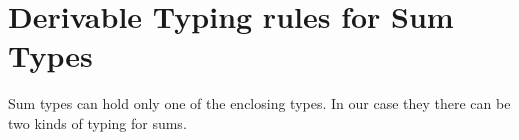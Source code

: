 \section{Derivable Typing rules for Sum Types}\label{sec:sums}
Sum types can hold only one of the enclosing types.
In our case they there can be two kinds of typing for sums.



